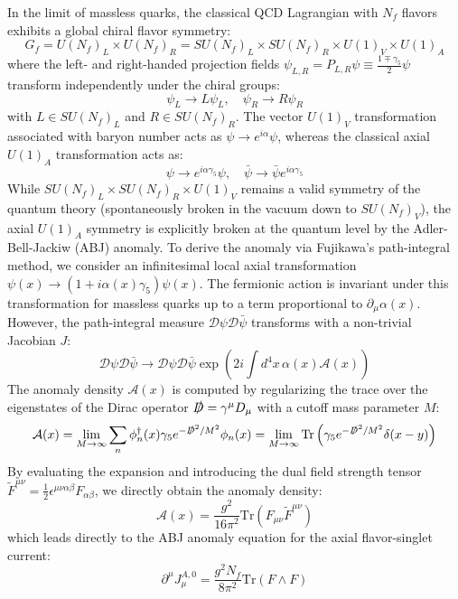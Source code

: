 In the limit of massless quarks, the classical QCD Lagrangian with $N_f$ flavors exhibits a global chiral flavor symmetry:
\begin{equation}
G_f = U(N_f)_L \times U(N_f)_R = SU(N_f)_L \times SU(N_f)_R \times U(1)_V \times U(1)_A
\end{equation}
where the left- and right-handed projection fields $\psi_{L,R} = P_{L,R}\psi \equiv \frac{1 \mp \gamma_5}{2}\psi$ transform independently under the chiral groups:
\begin{equation}
\psi_L \to L \psi_L, \quad \psi_R \to R \psi_R
\end{equation}
with $L \in SU(N_f)_L$ and $R \in SU(N_f)_R$. The vector $U(1)_V$ transformation associated with baryon number acts as $\psi \to e^{i\alpha}\psi$, whereas the classical axial $U(1)_A$ transformation acts as:
\begin{equation}
\psi \to e^{i\alpha \gamma_5}\psi, \quad \bar{\psi} \to \bar{\psi}e^{i\alpha \gamma_5}
\label{eq:axial_u1_transformation}
\end{equation}
While $SU(N_f)_L \times SU(N_f)_R \times U(1)_V$ remains a valid symmetry of the quantum theory (spontaneously broken in the vacuum down to $SU(N_f)_V$), the axial $U(1)_A$ symmetry is explicitly broken at the quantum level by the Adler-Bell-Jackiw (ABJ) anomaly. To derive the anomaly via Fujikawa's path-integral method, we consider an infinitesimal local axial transformation $\psi(x) \to (1 + i\alpha(x)\gamma_5)\psi(x)$. The fermionic action is invariant under this transformation for massless quarks up to a term proportional to $\partial_\mu \alpha(x)$. However, the path-integral measure $\mathcal{D}\psi \mathcal{D}\bar{\psi}$ transforms with a non-trivial Jacobian $J$:
\begin{equation}
\mathcal{D}\psi \mathcal{D}\bar{\psi} \to \mathcal{D}\psi \mathcal{D}\bar{\psi} \exp\left( 2i \int d^4x \, \alpha(x) \mathcal{A}(x) \right)
\end{equation}
The anomaly density $\mathcal{A}(x)$ is computed by regularizing the trace over the eigenstates of the Dirac operator $\slashed{D} = \gamma^\mu D_\mu$ with a cutoff mass parameter $M$:
\begin{equation}
\mathcal{A}(x) = \lim_{M \to \infty} \sum_n \phi_n^\dagger(x) \gamma_5 e^{-\slashed{D}^2/M^2} \phi_n(x) = \lim_{M \to \infty} \mathrm{Tr} \left( \gamma_5 e^{-\slashed{D}^2/M^2} \delta(x-y) \right)
\end{equation}
By evaluating the expansion and introducing the dual field strength tensor $\tilde{F}^{\mu\nu} = \frac{1}{2} \epsilon^{\mu\nu\alpha\beta} F_{\alpha\beta}$, we directly obtain the anomaly density:
\begin{equation}
\mathcal{A}(x) = \frac{g^2}{16\pi^2} \mathrm{Tr}(F_{\mu\nu}\tilde{F}^{\mu\nu})
\end{equation}
which leads directly to the ABJ anomaly equation for the axial flavor-singlet current:
\begin{equation}
\partial^\mu J_\mu^{A,0} = \frac{g^2 N_f}{8\pi^2} \mathrm{Tr}(F \wedge F)
\end{equation}

